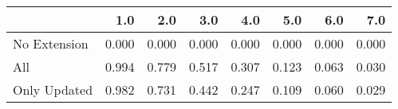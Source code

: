 \begin{tabular}{lrrrrrrr}
\toprule
{} &   1.0 &   2.0 &   3.0 &   4.0 &   5.0 &   6.0 &   7.0 \\
\midrule
No Extension & 0.000 & 0.000 & 0.000 & 0.000 & 0.000 & 0.000 & 0.000 \\
All          & 0.994 & 0.779 & 0.517 & 0.307 & 0.123 & 0.063 & 0.030 \\
Only Updated & 0.982 & 0.731 & 0.442 & 0.247 & 0.109 & 0.060 & 0.029 \\
\bottomrule
\end{tabular}
